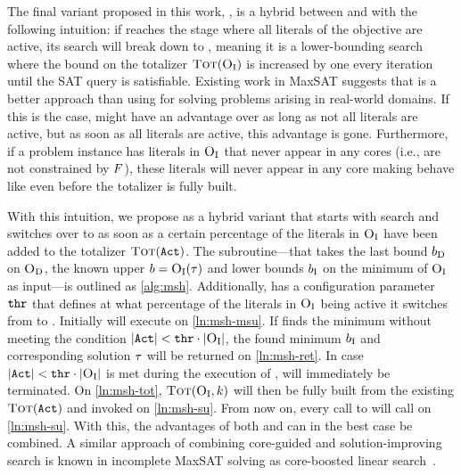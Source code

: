 The final variant proposed in this work, \msh{}, is a hybrid between \msu{} and \satunsat{} with the following intuition:
if \msu{}  reaches the stage where all literals of the objective are active, its search will break down to \unsatsat{}, meaning it is a lower-bounding search where the bound on the totalizer $\textsc{Tot}(\textsc{O}_{\text{I}})$ is increased by one every iteration until the SAT query is satisfiable.
Existing work in MaxSAT suggests that \satunsat{} is a better approach than using \unsatsat{} for solving problems arising in real-world domains.
If this is the case, \msu{} might have an advantage over \satunsat{} as long as not all literals are active, but as soon as all literals are active, this advantage is gone.
Furthermore, if a problem instance has literals in $\textsc{O}_{\text{I}}$ that never appear in any cores (i.e., are not constrained by $F$), these literals will never appear in any core making \msu{} behave like \unsatsat{} even before the totalizer is fully built.

With this intuition, we propose \msh{} as a hybrid variant that starts with \msu{} search and switches over to \satunsat{} as soon as a certain percentage of the literals in $\textsc{O}_{\text{I}}$ have been added to the totalizer $\textsc{Tot}(\texttt{Act})$.
The subroutine---that takes the last bound $b_{\text{D}}$ on $\textsc{O}_{\text{D}}$, the known upper $b=\textsc{O}_{\text{I}}(\tau)$ and lower bounds $b_{\text{I}}$ on the minimum of $\textsc{O}_{\text{I}}$ as input---is outlined as \cref{alg:msh}.
Additionally, \msh{} has a configuration parameter $\texttt{thr}$ that defines at what percentage of the literals in $\textsc{O}_{\text{I}}$ being active it switches from \msu{} to \satunsat{}.
Initially \msh{} will execute \msu{} on \cref{ln:msh-msu}.
If \msu{} finds the minimum without meeting the condition $|\texttt{Act}| < \texttt{thr} \cdot |\textsc{O}_{\text{I}}|$, the found minimum $b_{\text{I}}$ and corresponding solution $\tau$ will be returned on \cref{ln:msh-ret}.
In case $|\texttt{Act}| < \texttt{thr} \cdot |\textsc{O}_{\text{I}}|$ is met during the execution of \msu{}, \msu{} will immediately be terminated.
On \cref{ln:msh-tot}, $\textsc{Tot}(\textsc{O}_{\text{I}},k)$ will then be fully built from the existing $\textsc{Tot}(\texttt{Act})$ and \satunsat{} invoked on \cref{ln:msh-su}.
From now on, every call to \msh{} will call \satunsat{} on \cref{ln:msh-su}.
With this, the advantages of both \msu{} and \satunsat{} can in the best case be combined.
A similar approach of combining core-guided and solution-improving search is known in incomplete MaxSAT solving as core-boosted linear search~\autocite{DBLP:conf/cpaior/BergDS19}.

